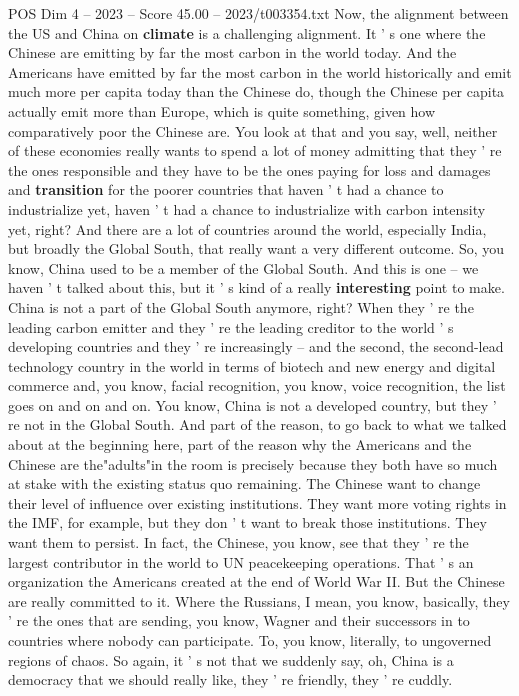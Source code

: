 \begin{textsample}{POS Dim 4 – 2023 – Score 45.00 – 2023/t003354.txt}
Now, the alignment between the US and China on \textbf{climate} is a challenging alignment.
It ' s one where the Chinese are emitting by far the most carbon in the world today.
And the Americans have emitted by far the most carbon in the world historically and emit much more per capita today than the Chinese do, though the Chinese per capita actually emit more than Europe, which is quite something, given how comparatively poor the Chinese are.
You look at that and you say, well, neither of these economies really wants to spend a lot of money admitting that they ' re the ones responsible and they have to be the ones paying for loss and damages and \textbf{transition} for the poorer countries that haven ' t had a chance to industrialize yet, haven ' t had a chance to industrialize with carbon intensity yet, right?
And there are a lot of countries around the world, especially India, but broadly the Global South, that really want a very different outcome.
So, you know, China used to be a member of the Global South.
And this is one -- we haven ' t talked about this, but it ' s kind of a really \textbf{interesting} point to make.
China is not a part of the Global South anymore, right?
When they ' re the leading carbon emitter and they ' re the leading creditor to the world ' s developing countries and they ' re increasingly -- and the second, the second-lead technology country in the world in terms of biotech and new energy and digital commerce and, you know, facial recognition, you know, voice recognition, the list goes on and on and on.
You know, China is not a developed country, but they ' re not in the Global South.
And part of the reason, to go back to what we talked about at the beginning here, part of the reason why the Americans and the Chinese are the"adults"in the room is precisely because they both have so much at stake with the existing status quo remaining.
The Chinese want to change their level of influence over existing institutions.
They want more voting rights in the IMF, for example, but they don ' t want to break those institutions.
They want them to persist.
In fact, the Chinese, you know, see that they ' re the largest contributor in the world to UN peacekeeping operations.
That ' s an organization the Americans created at the end of World War II.
But the Chinese are really committed to it.
Where the Russians, I mean, you know, basically, they ' re the ones that are sending, you know, Wagner and their successors in to countries where nobody can participate.
To, you know, literally, to ungoverned regions of chaos.
So again, it ' s not that we suddenly say, oh, China is a democracy that we should really like, they ' re friendly, they ' re cuddly.

\end{textsample}
